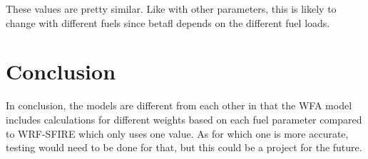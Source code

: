 \documentclass{article}
\begin{document}
These values are pretty similar. Like with other parameters, this is likely to change with different fuels since betafl depends on the different fuel loads. 
\section{Conclusion}

In conclusion, the models are different from each other in that the WFA model includes calculations for different weights based on each fuel parameter compared to WRF-SFIRE which only uses one value. As for which one is more accurate, testing would need to be done for that, but this could be a project for the future. 
\end{document}
